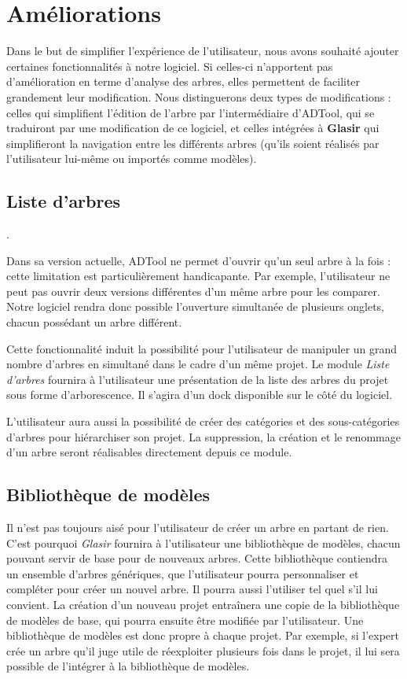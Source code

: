 \section{Améliorations}


	Dans le but de simplifier l'expérience de l'utilisateur, nous avons souhaité ajouter %
	 certaines fonctionnalités à notre logiciel. Si celles-ci n'apportent pas d'amélioration en terme d'analyse des arbres, elles permettent de faciliter grandement leur modification. Nous distinguerons deux types de modifications : celles qui simplifient l'édition de l'arbre par l’intermédiaire d'ADTool, qui se traduiront par une modification de ce logiciel, et celles intégrées à \textbf{Glasir} qui simplifieront la navigation entre les différents arbres (qu'ils soient réalisés par l'utilisateur lui-même ou importés comme modèles). 

	\subsection{Liste d'arbres}.

	Dans sa version actuelle, ADTool ne permet d'ouvrir qu'un seul arbre à la fois : cette limitation est particulièrement handicapante. Par exemple, l'utilisateur ne peut pas ouvrir deux versions différentes d'un même arbre pour les comparer. Notre logiciel rendra donc possible l'ouverture simultanée de plusieurs onglets, chacun possédant un arbre différent. 

	Cette fonctionnalité induit la possibilité pour l'utilisateur de manipuler un grand nombre d'arbres en simultané dans le cadre d'un même projet. Le module \emph{Liste d'arbres} fournira à l'utilisateur une présentation de la liste des arbres du projet sous forme d'arborescence. Il s'agira d'un dock disponible sur le côté du logiciel. 

	L'utilisateur aura aussi la possibilité de créer des catégories et des sous-catégories d'arbres pour hiérarchiser son projet. La suppression, la création et le renommage d'un arbre seront réalisables directement depuis ce module. %
	
	\subsection{Bibliothèque de modèles}

	Il n'est pas toujours aisé pour l'utilisateur de créer un arbre en partant de rien. C'est pourquoi \emph{Glasir} fournira à l'utilisateur une bibliothèque de modèles, chacun pouvant servir de base pour de nouveaux arbres. Cette bibliothèque contiendra un ensemble d'arbres génériques, que l'utilisateur pourra personnaliser et compléter pour créer un nouvel arbre. Il pourra aussi l'utiliser tel quel s'il lui convient. La création d'un nouveau projet entraînera une copie de la bibliothèque de modèles de base, qui pourra ensuite être modifiée par l'utilisateur. Une bibliothèque de modèles est donc propre à chaque projet. Par exemple, si l'expert crée un arbre qu'il juge utile de réexploiter plusieurs fois dans le projet, il lui sera possible de l'intégrer à la bibliothèque de modèles.


